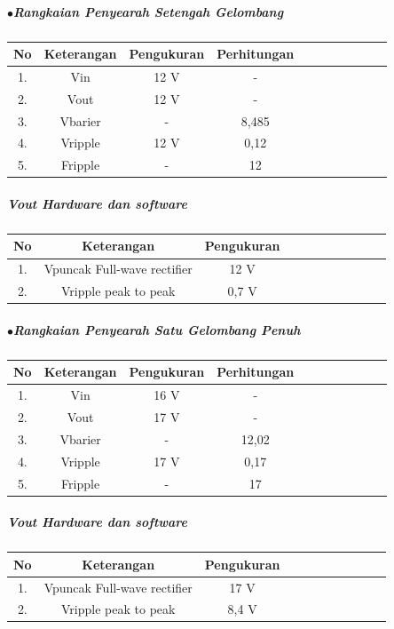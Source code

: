 \documentclass[12pt,a4paper]{article}
\begin{document}
\subparagraph*{$\bullet$\textbf{Rangkaian Penyearah Setengah Gelombang}}
\subparagraph*{ }
\begin{tabular}{|c|c|c|c|c|c|c|c|c|c|c|}        \hline
No & Keterangan & Pengukuran & Perhitungan \\ \hline 
1. & Vin 		& 12 V 			& - 	\\ \hline
2. & Vout 		& 12 V 			& - 	\\ \hline
3. & Vbarier 	& - 		& 8,485 	\\ \hline
4. & Vripple 	& 12 V 		& 0,12 		\\ \hline
5. & Fripple 	& - 		& 12	 	\\ \hline

 \end{tabular}

\subparagraph*{\textbf{Vout Hardware dan software}}
\begin{tabular}{|c|c|c|c|c|c|c|c|c|c|c|}        \hline
No & Keterangan & Pengukuran 			\\ \hline 
1. & Vpuncak Full-wave rectifier & 12 V \\ \hline
2. & Vripple peak to peak  		 & 0,7 V \\ \hline
\end{tabular}

\subparagraph*{$\bullet$\textbf{Rangkaian Penyearah Satu Gelombang Penuh}}
\subparagraph*{ }
\begin{tabular}{|c|c|c|c|c|c|c|c|c|c|c|}        \hline
No & Keterangan & Pengukuran & Perhitungan \\ \hline 
1. & Vin 		& 16 V 			& - 	\\ \hline
2. & Vout 		& 17 V 			& - 	\\ \hline
3. & Vbarier 	& - 		& 12,02 	\\ \hline
4. & Vripple 	& 17 V 		& 0,17 		\\ \hline
5. & Fripple 	& - 		& 17	 	\\ \hline

 \end{tabular}

\subparagraph*{\textbf{Vout Hardware dan software}}
\begin{tabular}{|c|c|c|c|c|c|c|c|c|c|c|}        \hline
No & Keterangan & Pengukuran 			\\ \hline 
1. & Vpuncak Full-wave rectifier & 17 V \\ \hline
2. & Vripple peak to peak  		 & 8,4 V \\ \hline
\end{tabular}
\end{document}
